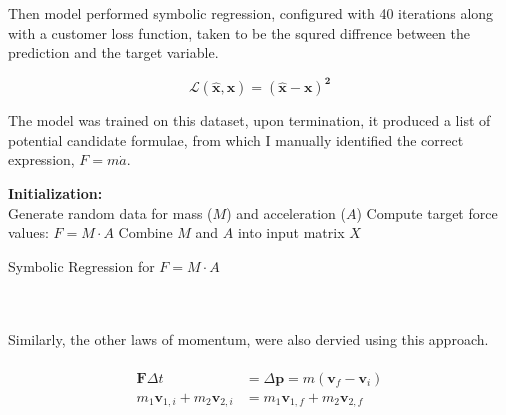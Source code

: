 \documentclass{article}
\begin{document}
Then model performed symbolic regression, configured with 40 iterations along with a customer loss function, taken to be the squred diffrence between the prediction and the target variable. \\ 

\begin{center}
  
  $$
  {\boldsymbol{\mathcal{L}(\hat{x}, x) = (\hat{x} - x)^2}}
$$

\end{center}


The model was trained on this dataset, upon termination, it produced a list of potential candidate formulae, from which I manually identified the correct expression, $F = m \dot a$. \\



\begin{algorithm}[H]
\SetAlgoLined
{}
\textbf{Initialization:} \\
Generate random data for mass (\( M \)) and acceleration (\( A \))\;
Compute target force values: \( F = M \cdot A \)\;
Combine \( M \) and \( A \) into input matrix \( X \)\;

\caption{Symbolic Regression for \( F = M \cdot A \)}
\end{algorithm}

\\
\\



Similarly, the other laws of momentum, were also dervied using this approach. \\ 



\\

\begin{align} \label{eq:impulse_momentum}
\mathbf{F} \Delta t &= \Delta \mathbf{p} = m(\mathbf{v}_f - \mathbf{v}_i) \\
m_1 \mathbf{v}_{1,i} + m_2 \mathbf{v}_{2,i} &= m_1 \mathbf{v}_{1,f} + m_2 \mathbf{v}_{2,f}
\end{align} 
\end{document}
